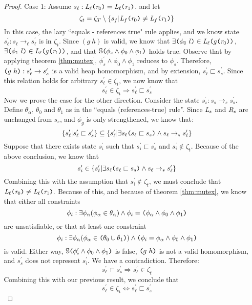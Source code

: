 \begin{proof}
Case 1: Assume $s_\ell : \emph{L}_\ell \texttt{(} \emph{r}_0\texttt{)} = \emph{L}_\ell \texttt{(} \emph{r}_1 \texttt{)}$, and let 
$$\zeta_t = \zeta_T \setminus \{ s_f | \emph{L}_f \texttt{(} \emph{r}_0\texttt{)} \neq \emph{L}_f \texttt{(} \emph{r}_1 \texttt{)} \}$$ In this case, the lazy ``equals - references true" rule applies, and we know state $s_\ell^\prime : s_\ell \rightarrow_\ell s_\ell^\prime$ is in $\zeta_t$. Since $(g\ h)$ is valid, we know that $\exists \texttt{(} \phi_0\ l \texttt{)} \in \emph{L}_\ell\texttt{(} g \texttt{(} \emph{r}_0\texttt{)} \texttt{)}$, $\exists \texttt{(} \phi_1\ l \texttt{)} \in \emph{L}_\ell\texttt{(} g \texttt{(} \emph{r}_1\texttt{)} \texttt{)}$, and that $\mathbb{S}\texttt{(}\phi_s\wedge\phi_0\wedge \phi_1\texttt{)}$ holds true. Observe that by applying theorem \ref{thm:mutex}, $\phi_s^\prime \wedge \phi_0 \wedge \phi_1$ reduces to $\phi_s$. Therefore, $\texttt{(} g\ h \texttt{)}: s_\ell^\prime \rightarrow s_s^\prime$ is a valid heap homomorphism, and by extension, $s_\ell^\prime \sqsubset s_s^\prime$. Since this relation holds for arbitrary $s_\ell^\prime \in \zeta_t$, we now know that $$s_\ell^\prime \in \zeta_t \Rightarrow s_\ell^\prime \sqsubset s_s^\prime$$
Now we prove the case for the other direction. Consider the state $s_s^\prime : s_s \rightarrow_s s_s^\prime$. Define $\theta_\alpha$, $\theta_0$ and $\theta_1$ as in the ``equals (references-true) rule''. Since $\emph{L}_s$ and $\emph{R}_s$ are unchanged from $s_s$, and $\phi_g$ is only strengthened,  we know that:
$$\{s_\ell^\prime | s_\ell^\prime \sqsubset s_s^\prime \} \subseteq \{s_\ell^\prime | \exists s_\ell \texttt{(} s_\ell \sqsubset s_s \texttt{)} \wedge s_\ell \rightarrow_s s_\ell^\prime\} $$
Suppose that there exists state $s_i^\prime$ such that $s_i^\prime \sqsubset s_s^\prime$ and $s_i^\prime \notin \zeta_t$. Because of the above conclusion, we know that $$s_i^\prime \in \{s_\ell^\prime | \exists s_\ell \texttt{(} s_\ell \sqsubset s_s\texttt{)} \wedge s_\ell \rightarrow_s s_\ell^\prime\}$$ Combining this with the assumption that $s_i^\prime \notin \zeta_t$, we must conclude that $\emph{L}_\ell \texttt{(} \emph{r}_0\texttt{)} \neq  \emph{L}_\ell \texttt{(} \emph{r}_1 \texttt{)}$. Because of this, and because of theorem \ref{thm:mutex}, we know that either all constraints $$\phi_i : \exists \phi_\alpha (\phi_\alpha \in \theta_\alpha)\wedge \phi_i = \texttt{(}\phi_\alpha \wedge \phi_0 \wedge \phi_1\texttt{)}$$ are unsatisfiable, or that at least one constraint $$\phi_i : \exists \phi_\alpha (\phi_\alpha \in \texttt{(} \theta_0 \cup \theta_1 \texttt{)})\wedge \texttt{(} \phi_i = \phi_\alpha \wedge \phi_0 \wedge \phi_1 \texttt{)}$$ is valid. Either way, $\mathbb{S}\texttt{(}\phi_i^\prime \wedge\phi_0\wedge \phi_1\texttt{)}$ is false, $\lp g\ h\rp$ is not a valid homomorphism, and $s_s^\prime$ does not represent $s_i^\prime$. We have a contradiction. Therefore: $$s_\ell^\prime \sqsubset s_s^\prime \Rightarrow s_\ell^\prime \in \zeta_t$$
Combining this with our previous result, we conclude that $$s_\ell^\prime \in \zeta_t \Leftrightarrow s_\ell^\prime \sqsubset s_s^\prime$$


\end{proof}
